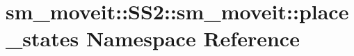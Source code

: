 \hypertarget{namespacesm__moveit_1_1SS2_1_1sm__moveit_1_1place__states}{}\section{sm\+\_\+moveit\+:\+:S\+S2\+:\+:sm\+\_\+moveit\+:\+:place\+\_\+states Namespace Reference}
\label{namespacesm__moveit_1_1SS2_1_1sm__moveit_1_1place__states}
